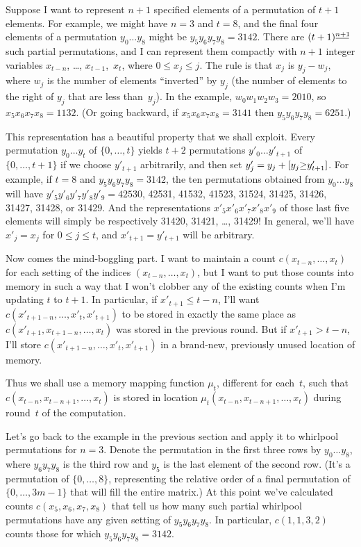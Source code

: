 Suppose I want to represent $n+1$ specified elements of a permutation
of $t+1$ elements. For example, we might have $n=3$ and $t=8$, and
the final four elements of a permutation $y_0\ldots y_8$ might be
$y_5y_6y_7y_8=3142$. There are $(t+1)\falling{n+1}$
such partial permutations, and I can represent them compactly with
$n+1$ integer variables $x_{t-n}$, \dots, $x_{t-1}$,~$x_t$, where
$0\le x_j\le j$. The rule is that $x_j$ is $y_j-w_j$,
where $w_j$ is the number of elements ``inverted'' by $y_j$
(the number of elements to the right of $y_j$ that are less than~$y_j$).
In the example, $w_0w_1w_2w_3=2010$, so $x_5x_6x_7x_8=1132$.
(Or going backward, if $x_5x_6x_7x_8=3141$ then $y_5y_6y_7y_8=6251$.)

This representation has a beautiful property that we shall exploit.
Every permutation $y_0\ldots y_t$ of $\{0,\ldots,t\}$ yields
$t+2$ permutations $y'_0\ldots y'_{t+1}$ of $\{0,\ldots,t+1\}$ if
we choose $y'_{t+1}$ arbitrarily,
and then set $y'_j=y_j+\hbox{[$y_j{\ge}y'_{t+1}$]}$.
For example, if $t=8$ and $y_5y_6y_7y_8=3142$, the ten permutations
obtained from $y_0\ldots y_8$ will have $y'_5y'_6y'_7y'_8y'_9=
42530$, 42531, 41532, 41523, 31524, 31425, 31426, 31427, 31428, or 31429.
And the representations $x'_5x'_6x'_7x'_8x'_9$ of those last five
elements will simply be respectively 31420, 31421, \dots, 31429!
In general, we'll have $x'_j=x_j$ for $0\le j\le t$, and $x'_{t+1}=y'_{t+1}$
will be arbitrary.

\fi

Now comes the mind-boggling part.
I want to maintain a count $c(x_{t-n},\ldots,x_t)$ for each setting of
the indices $(x_{t-n},\ldots,x_t)$, but I want to put those counts
into memory in such a way that I won't clobber any of the existing
counts when I'm updating $t$ to $t+1$. In particular, if $x'_{t+1}\le t-n$,
I'll want $c(x'_{t+1-n},\ldots,x'_t,x'_{t+1})$ to be stored in exactly
the same place as $c(x'_{t+1},x_{t+1-n},\ldots,x_t)$ was stored
in the previous round. But if $x'_{t+1}>t-n$, I'll store
$c(x'_{t+1-n},\ldots,x'_t,x'_{t+1})$ in a brand-new, previously
unused location of memory.

Thus we shall use a memory mapping function $\mu_t$, different for each~$t$,
such that $c(x_{t-n},x_{t-n+1},\ldots,x_t)$ is stored in location
$\mu_t(x_{t-n},x_{t-n+1},\ldots,x_t)$ during round~$t$ of the computation.

Let's go back to the example in the previous section and apply it to
whirlpool permutations for $n=3$. Denote the permutation in the first
three rows by $y_0\ldots y_8$, where $y_6y_7y_8$ is the third row and
$y_5$ is the last element of the second row. (It's a permutation
of $\{0,\ldots,8\}$, representing the relative order of a final
permutation of $\{0,\ldots,3m-1\}$ that will fill the entire matrix.)
At this point we've
calculated counts $c(x_5,x_6,x_7,x_8)$ that tell us how many such
partial whirlpool permutations have any given setting of $y_5y_6y_7y_8$. In
particular, $c(1,1,3,2)$ counts those for which $y_5y_6y_7y_8=3142$.

